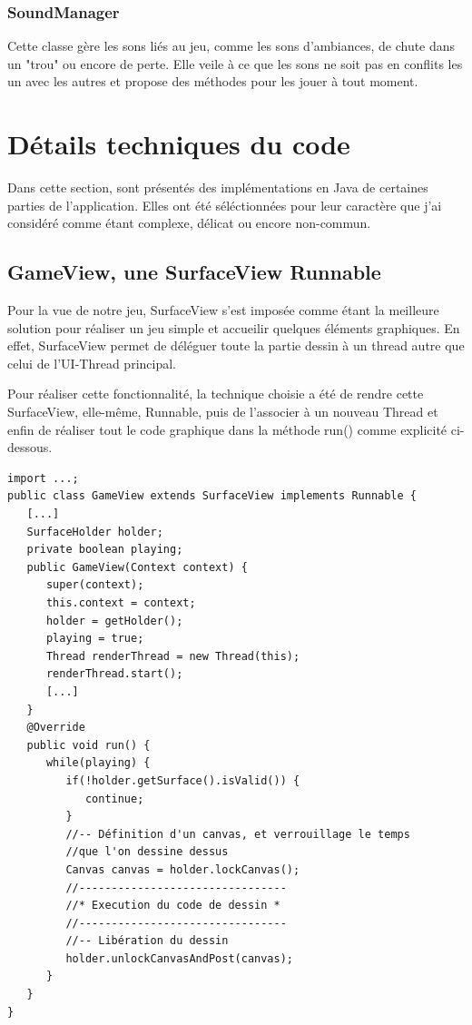 \documentclass[12pt,a4paper,abstract=on,parskip=full]{scrartcl}
\begin{document}
\subsubsection[SoundManager]{\color{blue} SoundManager}
Cette classe gère les sons liés au jeu, comme les sons d'ambiances, de chute dans un "trou" ou encore de perte.
Elle veile à ce que les sons ne soit pas en conflits les un avec les autres et propose des méthodes pour les jouer à tout moment.

\section{Détails techniques du code}

Dans cette section, sont présentés des implémentations en Java de certaines parties de l'application. Elles ont été séléctionnées pour leur caractère que j'ai considéré comme étant complexe, délicat ou encore non-commun.

\subsection{GameView, une SurfaceView Runnable}

Pour la vue de notre jeu, SurfaceView s'est imposée comme étant la meilleure solution pour réaliser un jeu simple et accueilir quelques éléments graphiques. En effet, SurfaceView permet de déléguer toute la partie dessin à un thread autre que celui de l'UI-Thread principal.

Pour réaliser cette fonctionnalité, la technique choisie a été de rendre cette SurfaceView, elle-même, Runnable, puis de l'associer à un nouveau Thread et enfin de réaliser tout le code graphique dans la méthode run() comme explicité ci-dessous.

\begin{verbatim}
import ...;
public class GameView extends SurfaceView implements Runnable {
   [...]
   SurfaceHolder holder;
   private boolean playing;	
   public GameView(Context context) {
      super(context);
      this.context = context;
      holder = getHolder();
      playing = true;
      Thread renderThread = new Thread(this);
      renderThread.start();     
      [...]
   }    
   @Override
   public void run() { 
      while(playing) {
         if(!holder.getSurface().isValid()) {
            continue;
         }
         //-- Définition d'un canvas, et verrouillage le temps 
         //que l'on dessine dessus
         Canvas canvas = holder.lockCanvas();                        
         //--------------------------------
         //* Execution du code de dessin *                                 
         //--------------------------------
         //-- Libération du dessin
         holder.unlockCanvasAndPost(canvas);           
      }
   }
}
\end{verbatim}
\end{document}
